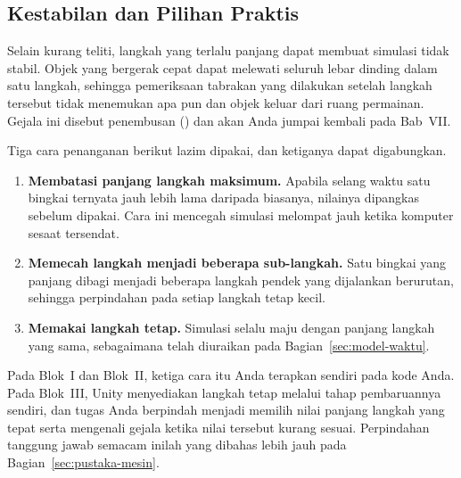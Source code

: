 \subsection{Kestabilan dan Pilihan Praktis}

Selain kurang teliti, langkah yang terlalu panjang dapat membuat simulasi
tidak stabil. Objek yang bergerak cepat dapat melewati seluruh lebar dinding
dalam satu langkah, sehingga pemeriksaan tabrakan yang dilakukan setelah
langkah tersebut tidak menemukan apa pun dan objek keluar dari ruang
permainan. Gejala ini disebut penembusan () dan akan Anda
jumpai kembali pada Bab~VII.

Tiga cara penanganan berikut lazim dipakai, dan ketiganya dapat digabungkan.

\begin{enumerate}
  \item \textbf{Membatasi panjang langkah maksimum.} Apabila selang waktu satu
        bingkai ternyata jauh lebih lama daripada biasanya, nilainya dipangkas
        sebelum dipakai. Cara ini mencegah simulasi melompat jauh ketika
        komputer sesaat tersendat.
  \item \textbf{Memecah langkah menjadi beberapa sub-langkah.} Satu bingkai
        yang panjang dibagi menjadi beberapa langkah pendek yang dijalankan
        berurutan, sehingga perpindahan pada setiap langkah tetap kecil.
  \item \textbf{Memakai langkah tetap.} Simulasi selalu maju dengan panjang
        langkah yang sama, sebagaimana telah diuraikan pada
        Bagian~\ref{sec:model-waktu}.
\end{enumerate}

Pada Blok~I dan Blok~II, ketiga cara itu Anda terapkan sendiri pada kode Anda.
Pada Blok~III, Unity menyediakan langkah tetap melalui tahap pembaruannya
sendiri, dan tugas Anda berpindah menjadi memilih nilai panjang langkah yang
tepat serta mengenali gejala ketika nilai tersebut kurang sesuai. Perpindahan
tanggung jawab semacam inilah yang dibahas lebih jauh pada
Bagian~\ref{sec:pustaka-mesin}.
